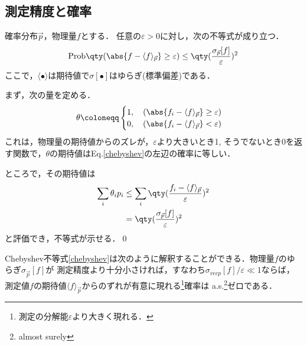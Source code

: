 %
\subsection{測定精度と確率}
  \begin{thm}[Chebyshev不等式]
    確率分布$\vec{p}$，物理量$f$とする．
    任意の$\varepsilon>0$に対し，次の不等式が成り立つ．
    \begin{align}
      \mathrm{Prob} \qty(\abs{f-\langle f \rangle_{\vec{p}}} \geq \varepsilon) \leq \qty(\frac{\sigma_{\vec{p}}[f]}{\varepsilon})^2\label{chebyshev}
    \end{align}
    ここで，$\langle\bullet\rangle$は期待値で$\sigma[\bullet]$はゆらぎ(標準偏差)である．
  \end{thm}
  \begin{pr}
    まず，次の量を定める．
    \begin{align}
      \theta \coloneqq 
        \begin{cases}
          1,\quad (\abs{f_i-\langle f \rangle _{\vec{p}}}\geq \varepsilon)\\
          0,\quad (\abs{f_i-\langle f \rangle _{\vec{p}}} < \varepsilon)
        \end{cases}
    \end{align}
    これは，物理量の期待値からのズレが，$\varepsilon$より大きいとき1,
    そうでないとき0を返す関数で，$\theta$の期待値はEq.\eqref{chebyshev}の左辺の確率に等しい．

    ところで，その期待値は
    \begin{align}
      \sum_{i} \theta_ip_i &\leq \sum_{i}\qty(\frac{f_i-\langle f \rangle_{\vec{p}}}{\varepsilon})^2\\
      &=\qty(\frac{\sigma_{\vec{p}}[f]}{\varepsilon})^2
    \end{align}
    と評価でき，不等式が示せる．\qed
  \end{pr}

  Chebyshev不等式\eqref{chebyshev}は次のように解釈することができる．物理量$f$のゆらぎ$\sigma_{\vec{p}}[f]$が
  測定精度より十分小さければ，すなわち$\sigma_{vec{p}}[f]/\varepsilon \ll 1$ならば，
  測定値$f$の期待値$\langle f \rangle_{\vec{p}}$からのずれが有意に現れる\footnote{測定の分解能$\varepsilon$より大きく現れる．}確率は
  a.s.\footnote{almost surely}ゼロである．
